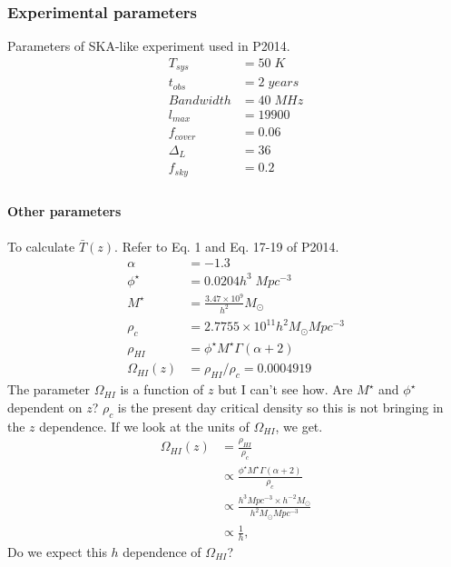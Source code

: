 \documentclass[12pt,a4paper]{article}
\begin{document}
\subsubsection{Experimental parameters}
Parameters of SKA-like experiment used in P2014. 
\begin{align*}
T_{sys} &= 50\;K\\
t_{obs} &= 2\; years\\
Bandwidth &= 40\;MHz \\
l_{max} &= 19900\\
f_{cover} &= 0.06\\
\Delta_L &= 36\\
f_{sky} &= 0.2\\
\end{align*}

\paragraph{Other parameters}
To calculate $ \bar{T}(z) $. Refer to Eq. 1 and Eq. 17-19 of P2014.
\begin{align*}
\alpha &= -1.3\\
\phi^\star &= 0.0204 h^3 \; Mpc^{-3} \\
M^\star &= \frac{3.47\times10^9}{h^2}M_\odot \\
\rho_c &= 2.7755 \times 10^{11} h^2 M_\odot Mpc^{-3}\\
\rho_{HI} &= \phi^\star M^\star \Gamma(\alpha + 2)  \\
\Omega_{HI}(z) &= \rho_{HI}/\rho_c = 0.0004919
\end{align*}
The parameter $ \Omega_{HI} $ is a function of $ z $ but I can't see how. Are $ M^\star $ and $ \phi^\star $ dependent on $ z $? $ \rho_c $ is the present day critical density so this is not bringing in the $ z $ dependence. If we look at the units of $ \Omega_{HI} $, we get.
\begin{align}
\Omega_{HI}(z) &= \frac{\rho_{HI}}{\rho_c} \\
&\propto \frac{\phi^\star M^\star \Gamma(\alpha + 2)}{\rho_c}\\
&\propto \frac{h^3 Mpc^{-3} \times h^{-2}M_\odot}{h^2 M_\odot Mpc^{-3}}\\
&\propto \frac{1}{h},
\end{align}
Do we expect this $ h $ dependence of $ \Omega_{HI} $?
\end{document}
